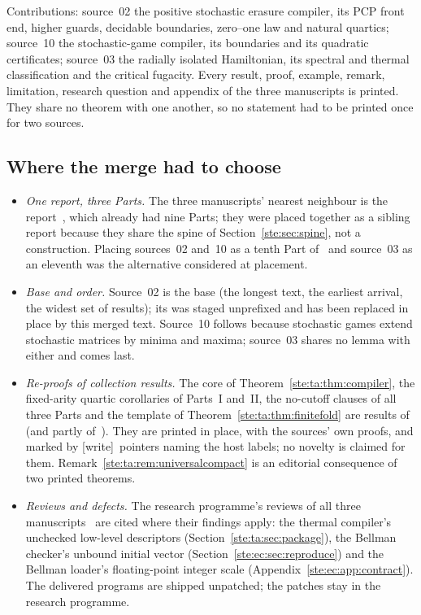 \documentclass[11pt,letterpaper]{article}
\theoremstyle{definition}
\theoremstyle{remark}
\newcommand{\wtag}{\textup{[write]}}
\begin{document}
Contributions: source~02 the positive stochastic erasure compiler, its PCP front end, higher guards, decidable boundaries, zero--one law and natural quartics; source~10 the stochastic-game compiler, its boundaries and its quadratic certificates; source~03 the radially isolated Hamiltonian, its spectral and thermal classification and the critical fugacity. Every result, proof, example, remark, limitation, research question and appendix of the three manuscripts is printed. They share no theorem with one another, so no statement had to be printed once for two sources.

\subsection{Where the merge had to choose}

\begin{itemize}
\item \emph{One report, three Parts.} The three manuscripts' nearest neighbour is the report~\cite{pqc}, which already had nine Parts; they were placed together as a sibling report because they share the spine of Section~\ref{ste:sec:spine}, not a construction. Placing sources~02 and~10 as a tenth Part of~\cite{pqc} and source~03 as an eleventh was the alternative considered at placement.
\item \emph{Base and order.} Source~02 is the base (the longest text, the earliest arrival, the widest set of results); its  was staged unprefixed and has been replaced in place by this merged text. Source~10 follows because stochastic games extend stochastic matrices by minima and maxima; source~03 shares no lemma with either and comes last.
\item \emph{Re-proofs of collection results.} The core of Theorem~\ref{ste:ta:thm:compiler}, the fixed-arity quartic corollaries of Parts~I and~II, the no-cutoff clauses of all three Parts and the template of Theorem~\ref{ste:ta:thm:finitefold} are results of~\cite{cdc} (and partly of~\cite{pqc}). They are printed in place, with the sources' own proofs, and marked by \wtag\ pointers naming the host labels; no novelty is claimed for them. Remark~\ref{ste:ta:rem:universalcompact} is an editorial consequence of two printed theorems.
\item \emph{Reviews and defects.} The research programme's reviews of all three manuscripts~\cite{review1977,review808} are cited where their findings apply: the thermal compiler's unchecked low-level descriptors (Section~\ref{ste:ta:sec:package}), the Bellman checker's unbound initial vector (Section~\ref{ste:ec:sec:reproduce}) and the Bellman loader's floating-point integer scale (Appendix~\ref{ste:ec:app:contract}). The delivered programs are shipped unpatched; the patches stay in the research programme.

\end{itemize}
\end{document}

